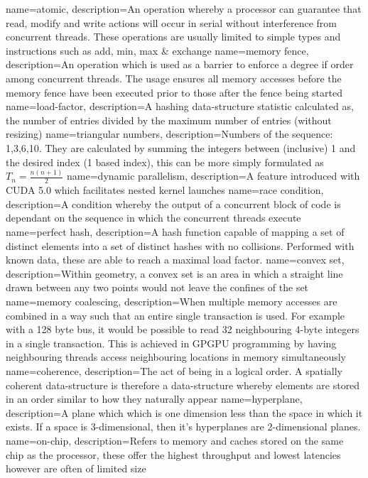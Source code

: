 {
  name=atomic,
  description={An operation whereby a processor can guarantee that read, modify and write actions will occur in serial without interference from concurrent threads. These operations are usually limited to simple types and instructions such as add, min, max \& exchange}
}
{
  name=memory fence,
  description={An operation which is used as a barrier to enforce a degree if order among concurrent threads. The usage ensures all memory accesses before the memory fence have been executed prior to those after the fence being started}
}
{
  name=load-factor,
  description={A hashing data-structure statistic calculated as, the number of entries divided by the maximum number of entries (without resizing)}
}
{
  name=triangular numbers,
  description={Numbers of the sequence: 1,3,6,10. They are calculated by summing the integers between (inclusive) 1 and the desired index (1 based index), this can be more simply formulated as $T_n=\frac{n(n+1)}{2}$}
}
{
  name=dynamic parallelism,
  description={A feature introduced with CUDA 5.0 which facilitates nested kernel launches}
}
{
  name=race condition,
  description={A condition whereby the output of a concurrent block of code is dependant on the sequence in which the concurrent threads execute}
}
{
  name=perfect hash,
  description={A hash function capable of mapping a set of distinct elements into a set of distinct hashes with no collisions. Performed with known data, these are able to reach a maximal load factor.}
}
{
  name=convex set,
  description={Within geometry, a convex set is an area in which a straight line drawn between any two points would not leave the confines of the set}
}
{
  name=memory coalescing,
  description={When multiple memory accesses are combined in a way such that an entire single transaction is used. For example with a 128 byte bus, it would be possible to read 32 neighbouring 4-byte integers in a single transaction. This is achieved in GPGPU programming by having neighbouring threads access neighbouring locations in memory simultaneously}
}
{
  name=coherence,
  description={The act of being in a logical order. A spatially coherent data-structure is therefore a data-structure whereby elements are stored in an order similar to how they naturally appear}
}
{
  name=hyperplane,
  description={A plane which which is one dimension less than the space in which it exists. If a space is 3-dimensional, then it's hyperplanes are 2-dimensional planes.}
}
{
  name=on-chip,
  description={Refers to memory and caches stored on the same chip as the processor, these offer the highest throughput and lowest latencies however are often of limited size}
}
